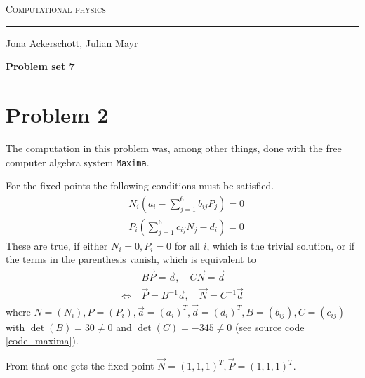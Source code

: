\documentclass[12pt, a4paper]{article}
\begin{document}
  \centerline{\Huge\scshape Computational physics}
  \vspace*{0.5cm}
  \hrule
  \vspace*{0.5cm}
  \centerline{Jona Ackerschott, Julian Mayr}
  \vspace*{1cm}
  \centerline{\Large\bfseries Problem set 7}
  \vspace*{0.5cm}

  \section*{Problem 2}
  The computation in this problem was, among other things, done with the free computer algebra system \texttt{Maxima}.

  For the fixed points the following conditions must be satisfied.
  \begin{align}
    &N_i \left(a_i - \sum_{j=1}^6 b_{ij} P_j \right) = 0 \nonumber \\
    &P_i \left(\sum_{j=1}^6 c_{ij} N_j - d_i \right) = 0
    \label{eq_fixed_point_condition}
  \end{align}
  These are true, if either $N_i = 0, P_i = 0$ for all $i$, which is the trivial solution, or if the terms in the parenthesis vanish, which is equivalent to
  \begin{align}
    &B \vec{P} = \vec{a}, \quad C \vec{N} = \vec{d} \nonumber \\
    \Leftrightarrow \ &\vec{P} = B^{-1} \vec{a}, \quad \vec{N} = C^{-1} \vec{d}
    \label{eq_fixed_point_condition_without_trivial}
  \end{align}
  where $N = (N_i), P = (P_i), \vec{a} = (a_i)^T, \vec{d} = (d_i)^T, B = (b_{ij}), C = (c_{ij})$ with $\det(B) = 30 \neq 0$ and $\det(C) = -345 \neq 0$ (see source code \ref{code_maxima}).

  From that one gets the fixed point $\vec{N} = (1, 1, 1)^T, \vec{P} = (1, 1, 1)^T$.
  
\end{document}
